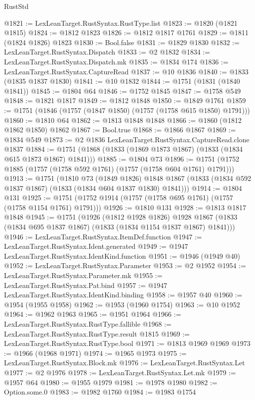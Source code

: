 \begin{lexlean}{RustStd}
\begin{coremodule}
@1821 := LexLeanTarget.RustSyntax.RustType.list
@1823 := @1820 (@1821 @1815)
@1824 := @1812 @1823
@1826 := @1812 @1817 @1761
@1829 := @1811 (@1824 @1826) @1823
@1830 := Bool.false
@1831 := @1829 @1830
@1832 := LexLeanTarget.RustSyntax.Dispatch
@1833 := @2 @1832
@1834 := LexLeanTarget.RustSyntax.Dispatch.mk
@1835 := @1834 @174
@1836 := LexLeanTarget.RustSyntax.CaptureRead
@1837 := @10 @1836
@1840 := @1833 (@1835 @1837 @1830)
@1841 := @10 @1832
@1844 := @1751 (@1831 (@1840 @1841))
@1845 := @1804 @64
@1846 := @1752 @1845
@1847 := @1758 @549
@1848 := @1821 @1817
@1849 := @1812 @1848
@1850 := @1849 @1761
@1859 := @1751 (@1846 (@1757 (@1847 @1850) (@1757 (@1758 @615 @1850) @1791)))
@1860 := @1810 @64
@1862 := @1813 @1848 @1848
@1866 := @1860 (@1812 @1862 @1850) @1862
@1867 := Bool.true
@1868 := @1866 @1867
@1869 := @1834 @549
@1873 := @2 @1836 LexLeanTarget.RustSyntax.CaptureRead.clone @1837
@1884 := @1751 (@1868 (@1833 (@1869 @1873 @1867) (@1833 (@1834 @615 @1873 @1867) @1841)))
@1885 := @1804 @73
@1896 := @1751 (@1752 @1885 (@1757 (@1758 @592 @1761) (@1757 (@1758 @604 @1761) @1791)))
@1913 := @1751
    (@1810
      @73
      (@1849 @1826)
      @1848
      @1867
      (@1833 (@1834 @592 @1837 @1867) (@1833 (@1834 @604 @1837 @1830) @1841)))
@1914 := @1804 @131
@1925 := @1751 (@1752 @1914 (@1757 (@1758 @695 @1761) (@1757 (@1758 @1154 @1761) @1791)))
@1926 := @1810 @131
@1928 := @1813 @1817 @1848
@1945 := @1751
    (@1926
      (@1812 @1928 @1826)
      @1928
      @1867
      (@1833 (@1834 @695 @1837 @1867) (@1833 (@1834 @1154 @1837 @1867) @1841)))
@1946 := LexLeanTarget.RustSyntax.ItemDef.function
@1947 := LexLeanTarget.RustSyntax.Ident.generated
@1949 := @1947 LexLeanTarget.RustSyntax.IdentKind.function
@1951 := @1946 (@1949 @40)
@1952 := LexLeanTarget.RustSyntax.Parameter
@1953 := @2 @1952
@1954 := LexLeanTarget.RustSyntax.Parameter.mk
@1955 := LexLeanTarget.RustSyntax.Pat.bind
@1957 := @1947 LexLeanTarget.RustSyntax.IdentKind.binding
@1958 := @1957 @40
@1960 := @1954 (@1955 @1958)
@1962 := @1953 (@1960 @1754)
@1963 := @10 @1952
@1964 := @1962 @1963
@1965 := @1951 @1964
@1966 := LexLeanTarget.RustSyntax.RustType.fallible
@1968 := LexLeanTarget.RustSyntax.RustType.result @1815
@1969 := LexLeanTarget.RustSyntax.RustType.bool
@1971 := @1813 @1969 @1969
@1973 := @1966 (@1968 @1971)
@1974 := @1965 @1973
@1975 := LexLeanTarget.RustSyntax.Block.mk
@1976 := LexLeanTarget.RustSyntax.Let
@1977 := @2 @1976
@1978 := LexLeanTarget.RustSyntax.Let.mk
@1979 := @1957 @64
@1980 := @1955 @1979
@1981 := @1978 @1980
@1982 := Option.some.{0}
@1983 := @1982 @1760
@1984 := @1983 @1754

\end{coremodule}
\end{lexlean}
